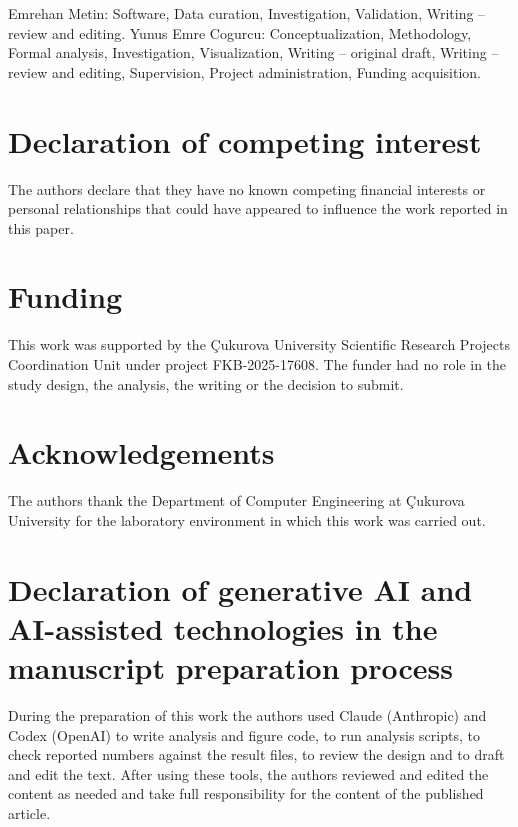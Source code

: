 \documentclass[preprint,12pt,authoryear]{elsarticle}
\begin{document}
Emrehan Metin: Software, Data curation, Investigation, Validation, Writing -- review and editing. Yunus Emre Cogurcu: Conceptualization, Methodology, Formal analysis, Investigation, Visualization, Writing -- original draft, Writing -- review and editing, Supervision, Project administration, Funding acquisition.

\section*{Declaration of competing interest}

The authors declare that they have no known competing financial interests or personal relationships that could have appeared to influence the work reported in this paper.

\section*{Funding}

This work was supported by the \c{C}ukurova University Scientific Research Projects Coordination Unit under project FKB-2025-17608. The funder had no role in the study design, the analysis, the writing or the decision to submit.

\section*{Acknowledgements}

The authors thank the Department of Computer Engineering at \c{C}ukurova University for the laboratory environment in which this work was carried out.

\section*{Declaration of generative AI and AI-assisted technologies in the manuscript preparation process}

During the preparation of this work the authors used Claude (Anthropic) and Codex (OpenAI) to write analysis and figure code, to run analysis scripts, to check reported numbers against the result files, to review the design and to draft and edit the text. After using these tools, the authors reviewed and edited the content as needed and take full responsibility for the content of the published article.



\end{document}
